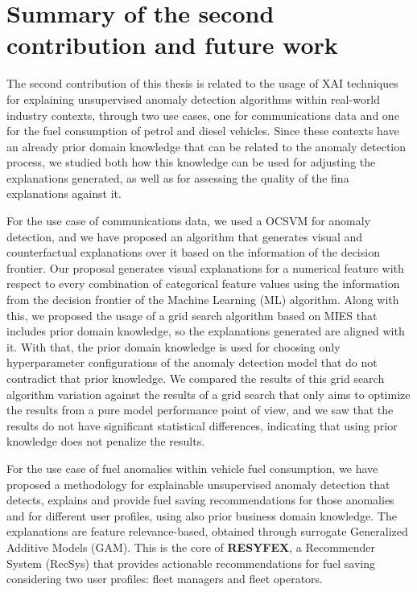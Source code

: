 \section{Summary of the second contribution and future work}\label{sec-conclusions-contrib-2}
The second contribution of this thesis is related to the usage of XAI techniques for explaining unsupervised anomaly detection algorithms within real-world industry contexts, through two use cases, one for communications data and one for the fuel consumption of petrol and diesel vehicles. Since these contexts have an already prior domain knowledge that can be related to the anomaly detection process, we studied both how this knowledge can be used for adjusting the explanations generated, as well as for assessing the quality of the fina explanations against it.

For the use case of communications data, we used a OCSVM for anomaly detection, and we have proposed an algorithm that generates visual and counterfactual explanations over it based on the information of the decision frontier. Our proposal generates visual explanations for a numerical feature with respect to every combination of categorical feature values using the information from the decision frontier of the Machine Learning (ML) algorithm. Along with this, we proposed the usage of a grid search algorithm based on MIES that includes prior domain knowledge, so the explanations generated are aligned with it. With that, the prior domain knowledge is used for choosing only hyperparameter configurations of the anomaly detection model that do not contradict that prior knowledge. We compared the results of this grid search algorithm variation against the results of a grid search that only aims to optimize the results from a pure model performance point of view, and we saw that the results do not have significant statistical differences, indicating that using prior knowledge does not penalize the results.

For the use case of fuel anomalies within vehicle fuel consumption, we have proposed a methodology for explainable unsupervised anomaly detection that detects, explains and provide fuel saving recommendations for those anomalies and for different user profiles, using also prior business domain knowledge. The explanations are feature relevance-based, obtained through surrogate Generalized Additive Models (GAM). This is the core of \textbf{RESYFEX}, a Recommender System (RecSys) that provides actionable recommendations for fuel saving considering two user profiles: fleet managers and fleet operators.

